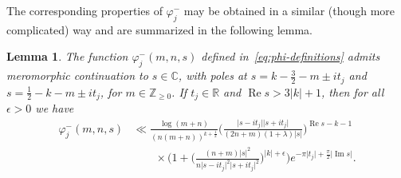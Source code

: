 \documentclass[11pt,reqno]{amsart}
\theoremstyle{plain}
\newtheorem{lemma}[theorem]{Lemma}
\theoremstyle{definition}
\numberwithin{equation}{section}
\renewcommand{\Im}{\operatorname{Im}}
\renewcommand{\Re}{\operatorname{Re}}
\begin{document}
The corresponding properties of $\varphi_j^-$ may be obtained in a similar (though more complicated) way and are summarized in the following lemma.

\begin{lemma}
The function $\varphi_j^-(m,n,s)$ defined in~\eqref{eq:phi-definitions} admits meromorphic continuation to $s \in \mathbb{C}$, with poles at $s = k- \frac{3}{2} - m \pm it_j$ and $s = \frac{1}{2} - k - m \pm it_j$, for $m \in \mathbb{Z}_{\geq 0}$. If $t_j \in \mathbb{R}$ and $\Re s > 3 \vert k \vert + 1$, then for all $\epsilon > 0$ we have
\begin{align} \label{eq:phi-minus-upper-bound}
	\varphi_j^-(m,n,s)
	&\ll \frac{\log (m+n)}{(n(m+n))^{k+\frac{1}{2}}}
	\Big( \frac{\vert s - it_j \vert \vert s + it_j\vert}{(2n+m)(1+\lambda)\vert s \vert }\Big)^{\Re s -k-1}\\
	& \qquad
	\times \Big(
		1 + \Big( \frac{(n+m)\vert s \vert^2}{n\vert s - it_j \vert^2 \vert s + it_j\vert^2}\Big)^{\vert k \vert + \epsilon} \Big)
		e^{-\pi \vert t_j \vert + \frac{\pi}{2} \vert \Im s \vert}.
\end{align}
\end{lemma}
\end{document}
